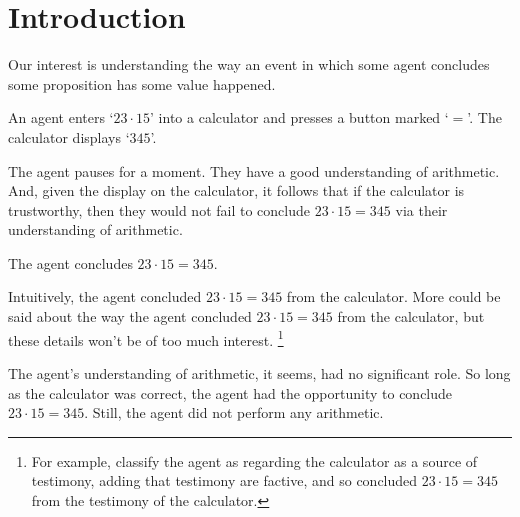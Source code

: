 \chapter{Introduction}
\label{cha:intro}

\begin{note}
  Our interest is understanding the way an event in which some agent concludes some proposition has some value happened.

  \begin{scenario}[Multiplication]
    \label{illu:gist:calc}
    An agent enters `\(23 \cdot 15\)' into a calculator and presses a button marked `\(=\)'.
    The calculator displays `\(345\)'.

    The agent pauses for a moment.
    They have a good understanding of arithmetic.
    And, given the display on the calculator, it follows that if the calculator is trustworthy, then they would not fail to conclude \(23 \cdot 15 = 345\) via their understanding of arithmetic.

    The agent concludes \(23 \cdot 15 = 345\).
  \end{scenario}

  Intuitively, the agent concluded \(23 \cdot 15 = 345\) from the calculator.
  More could be said about the way the agent concluded \(23 \cdot 15 = 345\) from the calculator, but these details won't be of too much interest.%
  \footnote{
    For example, classify the agent as regarding the calculator as a source of testimony, adding that testimony are factive, and so concluded \(23 \cdot 15 = 345\) from the testimony of the calculator.
  }

  The agent's understanding of arithmetic, it seems, had no significant role.
  So long as the calculator was correct, the agent had the opportunity to conclude \(23 \cdot 15 = 345\).
  Still, the agent did not perform any arithmetic.
\end{note}

